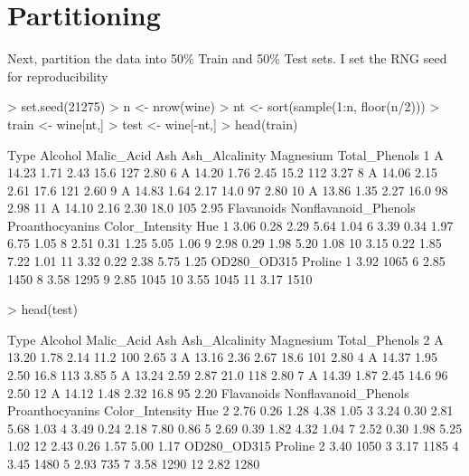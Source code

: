 \documentclass{article}
\begin{document}
\section*{Partitioning}
Next, partition the data into 50\% Train and 50\% Test sets. I set the RNG seed for reproducibility
\begin{Schunk}
\begin{Sinput}
> set.seed(21275)
> n <- nrow(wine)
> nt <- sort(sample(1:n, floor(n/2)))
> train <- wine[nt,]
> test <- wine[-nt,]
> head(train)
\end{Sinput}
\begin{Soutput}
   Type Alcohol Malic_Acid  Ash Ash_Alcalinity Magnesium Total_Phenols
1     A   14.23       1.71 2.43           15.6       127          2.80
6     A   14.20       1.76 2.45           15.2       112          3.27
8     A   14.06       2.15 2.61           17.6       121          2.60
9     A   14.83       1.64 2.17           14.0        97          2.80
10    A   13.86       1.35 2.27           16.0        98          2.98
11    A   14.10       2.16 2.30           18.0       105          2.95
   Flavanoids Nonflavanoid_Phenols Proanthocyanins Color_Intensity  Hue
1        3.06                 0.28            2.29            5.64 1.04
6        3.39                 0.34            1.97            6.75 1.05
8        2.51                 0.31            1.25            5.05 1.06
9        2.98                 0.29            1.98            5.20 1.08
10       3.15                 0.22            1.85            7.22 1.01
11       3.32                 0.22            2.38            5.75 1.25
   OD280_OD315 Proline
1         3.92    1065
6         2.85    1450
8         3.58    1295
9         2.85    1045
10        3.55    1045
11        3.17    1510
\end{Soutput}
\begin{Sinput}
> head(test)
\end{Sinput}
\begin{Soutput}
   Type Alcohol Malic_Acid  Ash Ash_Alcalinity Magnesium Total_Phenols
2     A   13.20       1.78 2.14           11.2       100          2.65
3     A   13.16       2.36 2.67           18.6       101          2.80
4     A   14.37       1.95 2.50           16.8       113          3.85
5     A   13.24       2.59 2.87           21.0       118          2.80
7     A   14.39       1.87 2.45           14.6        96          2.50
12    A   14.12       1.48 2.32           16.8        95          2.20
   Flavanoids Nonflavanoid_Phenols Proanthocyanins Color_Intensity  Hue
2        2.76                 0.26            1.28            4.38 1.05
3        3.24                 0.30            2.81            5.68 1.03
4        3.49                 0.24            2.18            7.80 0.86
5        2.69                 0.39            1.82            4.32 1.04
7        2.52                 0.30            1.98            5.25 1.02
12       2.43                 0.26            1.57            5.00 1.17
   OD280_OD315 Proline
2         3.40    1050
3         3.17    1185
4         3.45    1480
5         2.93     735
7         3.58    1290
12        2.82    1280
\end{Soutput}
\end{Schunk}
\end{document}
